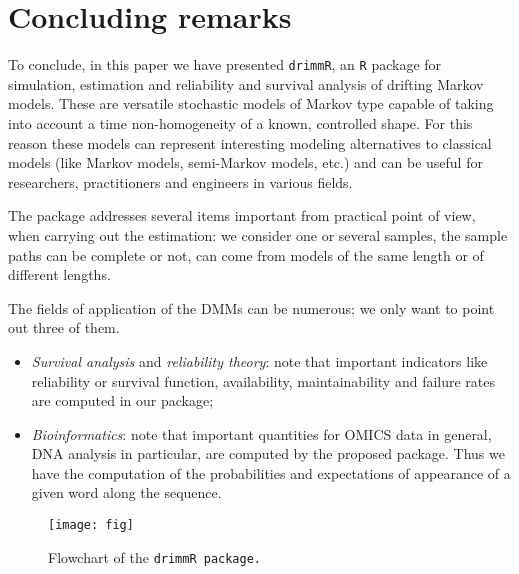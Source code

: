 \documentclass[article,nojss]{jss}\usepackage[]{graphicx}\usepackage[]{color}
\begin{document}
\clearpage

\section{Concluding remarks} \label{concluding}

To conclude, in this paper we have presented {\tt drimmR}, an {\tt R} package for  simulation, estimation and reliability and survival analysis of drifting Markov models. These are versatile stochastic models of Markov type capable of taking into account a time non-homogeneity of a known, controlled shape. For this reason these models can represent interesting modeling alternatives to classical models (like Markov models, semi-Markov models, etc.) and can be useful for researchers, practitioners and engineers in various fields.

The package addresses several items important from practical point of view, when carrying out the estimation: we consider one or several samples, the sample paths can be complete or not, can come from models of the same length or of different lengths.

The fields of application of the DMMs can be numerous; we only want to point out three of them.

\begin{itemize}
\item  \emph{Survival analysis} and \emph{reliability theory}: note that important indicators like reliability or survival function, availability, maintainability and failure rates are computed in our package;
\item  \emph{Bioinformatics}: note that important quantities for OMICS data in general,  DNA analysis in particular, are computed by the proposed package. Thus we have the computation of the  probabilities and expectations of  appearance of a given word along the sequence.

\end{itemize}


\clearpage



\printbibliography


\begin{figure}[htbp]
\centering
\texttt{[image: fig]}
\caption{Flowchart of the \tt{drimmR} package. } \label{fig}
\end{figure}
\end{document}
